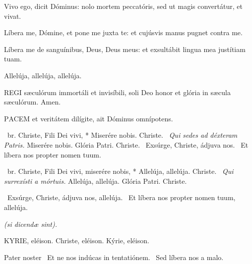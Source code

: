 

 Vivo ego, dicit Dóminus: nolo mortem peccatóris, sed ut magis convertátur, et vivat.


 Líbera me, Dómine, et pone me juxta te: et cujúsvis manus pugnet contra me.


 Líbera me de sanguínibus, Deus, Deus meus: et exsultábit lingua mea justítiam tuam.

  Allelúja, allelúja, allelúja.



\lettrine[lines=2]{R}{EGI} sæculórum immortáli et invisíbili, soli Deo honor et glória in sæcula sæculórum. Amen.



\lettrine[lines=2]{P}{ACEM} et veritátem dilígite, ait Dóminus omnípotens.

\R\ br. Christe, Fili Dei vivi, * Miserére nobis. Christe. \V\ \textit{Qui sedes ad déxteram Patris.} Miserére nobis. Glória Patri. Christe. \V\ Exsúrge, Christe, ádjuva nos. \R\ Et líbera nos propter nomen tuum.



\R\ br. Christe, Fili Dei vivi, miserére nobis, * Allelúja, allelúja. Christe. \V\ \textit{Qui surrexísti a mórtuis.} Allelúja, allelúja. Glória Patri. Christe.

\V\ Exsúrge, Christe, ádjuva nos, allelúja. \R\ Et líbera nos propter nomen tuum, allelúja.

\sectionornament


\textit{(si dicendæ sint).}

KYRIE, eléison. Christe, eléison. Kýrie, eléison.

Pater noster  \V\ Et ne nos indúcas in tentatiónem. \R\ Sed líbera nos a malo.


